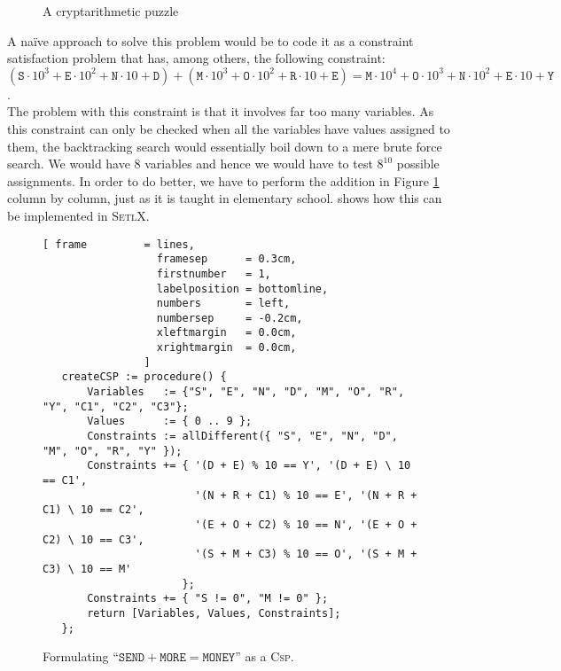 \begin{figure}[!ht]
\centering
{}

\caption{A cryptarithmetic puzzle}
\label{fig:send-more-money.pdf}
\end{figure}


\noindent
A na\"ive approach to solve this problem would be to code it as a constraint satisfaction problem that has,
among others,  the
following constraint:
\\[0.2cm]
\hspace*{1.3cm}
$   (\texttt{S} \cdot 10^3 + \texttt{E} \cdot 10^2 + \texttt{N} \cdot 10 + \texttt{D}) 
  + (\texttt{M} \cdot 10^3 + \texttt{O} \cdot 10^2 + \texttt{R} \cdot 10 + \texttt{E})
  = \texttt{M} \cdot 10^4 + \texttt{O} \cdot 10^3 + \texttt{N} \cdot 10^2 + \texttt{E} \cdot 10 + \texttt{Y}
$.
\\[0.2cm]
The problem with this constraint is that it involves far too many variables.  As this constraint can only be
checked when all the variables have values assigned to them, the backtracking search would essentially
boil down to a mere brute force search.  We would have 8 variables and hence we would have to test $8^{10}$
possible assignments. In order to do better, we have to perform the addition in Figure
 \ref{fig:send-more-money.pdf} column by column, just as it is taught in elementary school.
  shows how this can be implemented in \textsc{SetlX}.

\begin{figure}[!ht]
\centering
\begin{Verbatim}[ frame         = lines, 
                  framesep      = 0.3cm, 
                  firstnumber   = 1,
                  labelposition = bottomline,
                  numbers       = left,
                  numbersep     = -0.2cm,
                  xleftmargin   = 0.0cm,
                  xrightmargin  = 0.0cm,
                ]
   createCSP := procedure() {
       Variables   := {"S", "E", "N", "D", "M", "O", "R", "Y", "C1", "C2", "C3"};
       Values      := { 0 .. 9 };
       Constraints := allDifferent({ "S", "E", "N", "D", "M", "O", "R", "Y" });
       Constraints += { '(D + E) % 10 == Y', '(D + E) \ 10 == C1',
                        '(N + R + C1) % 10 == E', '(N + R + C1) \ 10 == C2',
                        '(E + O + C2) % 10 == N', '(E + O + C2) \ 10 == C3',
                        '(S + M + C3) % 10 == O', '(S + M + C3) \ 10 == M'
                      };
       Constraints += { "S != 0", "M != 0" };
       return [Variables, Values, Constraints];
   };
\end{Verbatim}
\vspace*{-0.3cm}
\caption{Formulating ``$\texttt{SEND} + \texttt{MORE} = \texttt{MONEY}$'' as a \textsc{Csp}.}
\label{fig:send-more-money.stlx}
\end{figure}

